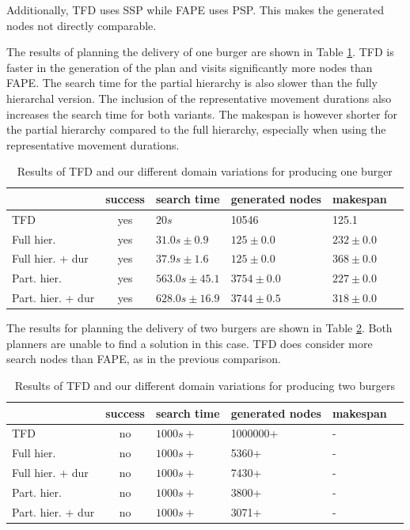 Additionally, \ac{TFD} uses \ac{SSP} while \ac{FAPE} uses \ac{PSP}.
This makes the generated nodes not directly comparable.

The results of planning the delivery of one burger are shown in Table \ref{tab:eval-burger}.
TFD is faster in the generation of the plan and visits significantly more nodes than \ac{FAPE}.
The search time for the partial hierarchy is also slower than the fully hierarchal version.
The inclusion of the representative movement durations also increases the search time for both variants.
The makespan is however shorter for the partial hierarchy compared to the full hierarchy, especially when using the representative movement durations.


\begin{table}
  \centering
  \begin{tabular}{lcllll}
                   & success & search time  & generated nodes & makespan         \\
    \hline
    TFD                & yes & $20s$            &  10546          &  125.1       \\
    Full hier.            & yes & $31.0s\pm 0.9$   & $125\pm 0.0$    &  $232\pm 0.0$            \\
    Full hier. + dur      & yes & $37.9s\pm 1.6$   & $125\pm 0.0$    &  $368\pm 0.0$      \\
    Part. hier.        & yes & $563.0s\pm 45.1$ & $3754\pm 0.0$   &  $227\pm 0.0$   \\
    Part. hier. + dur & yes & $628.0s\pm 16.9$ & $3744\pm 0.5$   &  $318\pm 0.0$            \\
  \end{tabular}
  \caption[Results for producing one burger]{Results of \ac{TFD} and our different domain variations for producing one burger}
  \label{tab:eval-burger}
\end{table}

The results for planning the delivery of two burgers are shown in Table \ref{tab:eval-burgers}.
Both planners are unable to find a solution in this case.
TFD does consider more search nodes than \ac{FAPE}, as in the previous comparison.

\begin{table}
  \centering
  \begin{tabular}{lcllll}
    & success & search time  & generated nodes & makespan         \\
  \hline
  TFD             & no & $1000s+$ & 1000000+ &  -       \\
  Full hier.            & no & $1000s+$ & 5360+    &  -          \\
  Full hier. + dur      & no & $1000s+$ & 7430+    &  -    \\
  Part. hier.       & no & $1000s+$ & 3800+    &  - \\
  Part. hier. + dur & no & $1000s+$ & 3071+    &  -          \\
  \end{tabular}
  \caption[Results for producing two burgers]{Results of \ac{TFD} and our different domain variations for producing two burgers}
  \label{tab:eval-burgers}
\end{table}

